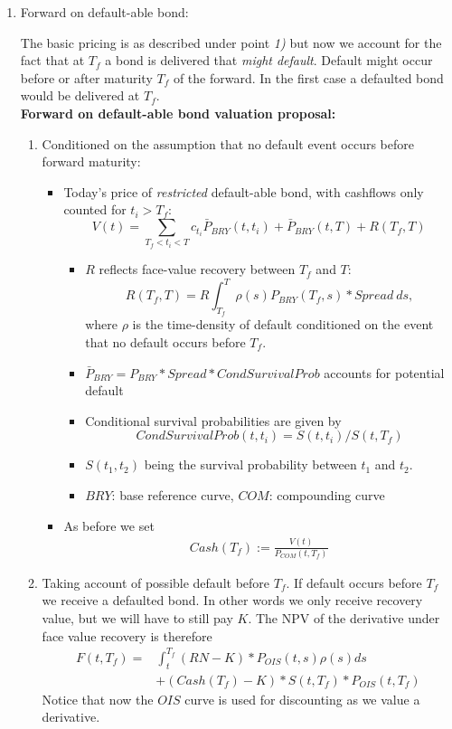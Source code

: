 \begin{enumerate}
\item Forward on default-able bond:

The basic pricing is as described under point \emph{1)} but now we account for the fact that at $T_f$ a bond is delivered that \emph{might default}. Default might occur before or after maturity $T_f$ of the forward. In the first case a defaulted bond would be delivered at $T_f$.\\

\textbf{Forward on default-able bond valuation proposal:}
%
%
\begin{enumerate}
	\item Conditioned on the assumption that no default event occurs before forward maturity:
	\begin{itemize}
		\item Today's price of \emph{restricted} default-able bond, with cashflows only counted for $t_i>T_f$:
		$$V(t)=\sum_{ T_f<t_i<T}c_{t_i}{\bar{P}_{BRY}}(t,t_i)+\bar{P}_{BRY}(t,T)+R(T_f,T)$$
		\begin{itemize}
			\item $R$ reflects face-value recovery between $T_f$ and $T$: $$R(T_f,T)=R\int_{T_f}^T\rho(s){P}_{BRY}(T_f,s)*Spread\ d s,$$ where $\rho$ is the time-density of default conditioned on the event that no default occurs before $T_f$.
			\item $\bar{P}_{BRY}=P_{BRY}*Spread*CondSurvivalProb$ accounts for potential default
			\item Conditional survival probabilities are given by $$CondSurvivalProb(t,t_i)=S(t,t_i)/S(t,T_f)$$
			\item $S(t_1,t_2)$ being the survival probability between $t_1$ and $t_2$.
			\item $BRY$: base reference curve, $COM$: compounding curve
		\end{itemize}
		\item As before we set
		 \begin{align*}
		Cash(T_f):=\frac{V(t)}{{P}_{COM}(t,T_f)}
		\end{align*}
	\end{itemize}

	\item Taking account of possible default before $T_f$. If default occurs before $T_f$ we receive a defaulted bond. In other words we only receive recovery value, but we will have to still pay $K$. The NPV of the derivative under face value recovery is therefore
	\begin{align*}
	F(t,T_f)=&\int_{t}^{T_f}(RN-K)*P_{OIS}(t,s)\rho(s)d s\\
	&+ (Cash(T_f)-K)*S(t,T_f)*P_{OIS}(t,T_f)
	\end{align*}
	Notice that now the $OIS$ curve is used for discounting as we value a derivative.

\end{enumerate}

\end{enumerate}

